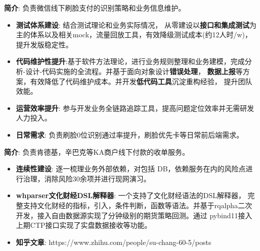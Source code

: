 \documentclass{resume}
\begin{document}
\begin{onehalfspacing}
\textbf{简介}: 负责微信线下刷脸支付的识别策略和业务信息维护。
 \begin{itemize}[parsep=0.5ex]
   \item \textbf{测试体系建设}: 结合测试理论和业务实际情况， 从零建设以\textbf{接口和集成测试}为主的体系以及相关mock，流量回放工具，有效降级测试成本(约12人时/w)， 提升发版稳定性。
   \item \textbf{代码维护性提升}:基于软件方法理论，进行业务规则整理和业务建模，完成分析-设计-代码实施的全流程。并基于面向对象设计\textbf{错误处理}， \textbf{数据上报}等方案，有效降低了代码维护成本。并开发\textbf{低代码工具}沉淀重构经验， 提升团队效能。
   \item \textbf{运营效率提升}: 参与开发业务全链路追踪工具，提高问题定位效率并无需研发人力投入。
   \item \textbf{日常需求}: 负责刷脸0位识别通过率提升，刷脸优先卡等日常前后端需求。
\end{itemize}
\end{onehalfspacing}



\begin{onehalfspacing}
\textbf{简介}: 负责肯德基，辛巴克等KA商户线下付款的收单服务。
 \begin{itemize}[parsep=0.5ex]
   \item \textbf{连续性建设}: 逐一梳理业务外部依赖，对包括 DB，依赖服务在内的风险点进行治理，消除风险30余项并进行现网演习。
\end{itemize}
\end{onehalfspacing}



\begin{onehalfspacing}
\begin{itemize}[parsep=0.5ex]
    \item \textbf{whparser文化财经DSL解释器}: 一个支持了文化财经语法的DSL解释器， 完整支持文化财经的指标，引入，条件判断，函数等语法。并基于rqalpha二次开发，接入自由数据源实现了分钟级别的期货策略回测。通过 pybind11接入上期CTP接口实现了实盘数据接收等功能。
    \item \textbf{知乎文章}:  https://www.zhihu.com/people/su-chang-60-5/posts
\end{itemize}
\end{onehalfspacing}
\end{document}
